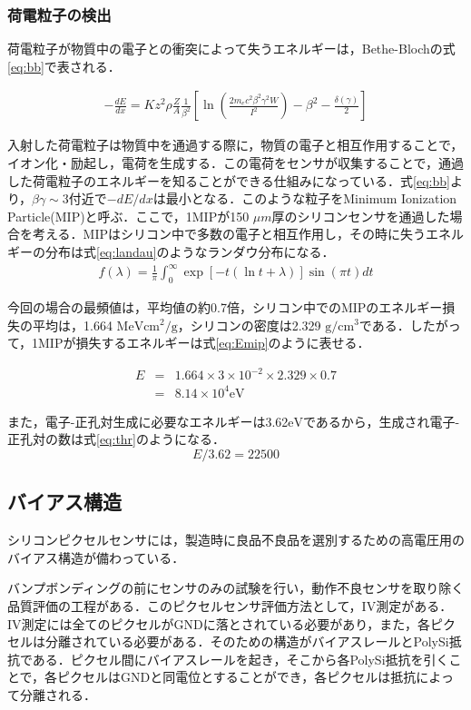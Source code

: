 \subsubsection*{荷電粒子の検出}
荷電粒子が物質中の電子との衝突によって失うエネルギーは，Bethe-Blochの式\ref{eq:bb}で表される．\par
\begin{eqnarray}
  \label{eq:bb}
  - \frac{dE}{dx} = K z^2 \rho \frac{Z}{A} \frac{1}{\beta^2} \left[ \ln \left( \frac{2m_e c^2 \beta^2 \gamma^2 W}{I^2} \right) - \beta^2 - \frac{\delta(\gamma)}{2} \right]
\end{eqnarray}

入射した荷電粒子は物質中を通過する際に，物質の電子と相互作用することで，イオン化・励起し，電荷を生成する．この電荷をセンサが収集することで，通過した荷電粒子のエネルギーを知ることができる仕組みになっている．式\ref{eq:bb}より，$\beta \gamma \sim 3$付近で$-dE/dx$は最小となる．このような粒子をMinimum Ionization Particle(MIP)と呼ぶ．ここで，1MIPが150 $\mu m$厚のシリコンセンサを通過した場合を考える．MIPはシリコン中で多数の電子と相互作用し，その時に失うエネルギーの分布は式\ref{eq:landau}のようなランダウ分布になる．
\begin{eqnarray}
  \label{eq:landau}
  f(\lambda) = \frac{1}{\pi} \int ^{\infty} _0 \exp[-t (\ln t+\lambda) ] \sin(\pi t) dt
\end{eqnarray}

今回の場合の最頻値は，平均値の約0.7倍，シリコン中でのMIPのエネルギー損失の平均は，1.664 $\mathrm{MeV cm^2/g}$，シリコンの密度は2.329 $\mathrm{g/cm^3}$である．したがって，1MIPが損失するエネルギーは式\ref{eq:Emip}のように表せる．

\begin{eqnarray}
  E &=& 1.664 \times 3 \times 10^{-2} \times 2.329 \times 0.7 \nonumber \\
  \label{eq:Emip}
  &=& 8.14 \times 10^4 \mathrm{eV}
\end{eqnarray}

また，電子-正孔対生成に必要なエネルギーは3.62$\mathrm{eV}$であるから，生成され電子-正孔対の数は式\ref{eq:thr}のようになる．
\begin{equation}
  \label{eq:thr}
  E / 3.62 = 22500
\end{equation}


\subsection{バイアス構造}
シリコンピクセルセンサには，製造時に良品不良品を選別するための高電圧用のバイアス構造が備わっている．\par
バンプボンディングの前にセンサのみの試験を行い，動作不良センサを取り除く品質評価の工程がある．このピクセルセンサ評価方法として，IV測定がある．IV測定には全てのピクセルがGNDに落とされている必要があり，また，各ピクセルは分離されている必要がある．そのための構造がバイアスレールとPolySi抵抗である．ピクセル間にバイアスレールを起き，そこから各PolySi抵抗を引くことで，各ピクセルはGNDと同電位とすることができ，各ピクセルは抵抗によって分離される．\par

